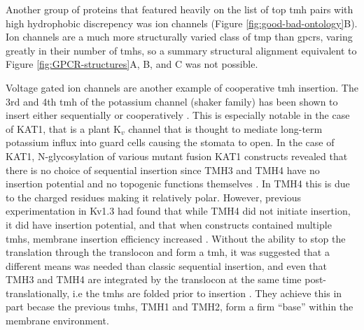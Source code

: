 Another group of proteins that featured heavily on the list of top \gls{tmh} pairs with high hydrophobic discrepency was ion channels (Figure \ref{fig:good-bad-ontology}B).
Ion channels are a much more structurally varied class of \gls{tmp} than \gls{gpcr}s, varing greatly in their number of \gls{tmh}s, so a summary structural alignment equivalent to Figure \ref{fig:GPCR-structures}A, B, and C was not possible.

Voltage gated ion channels are another example of cooperative \gls{tmh} insertion.
The 3rd and 4th \gls{tmh} of the potassium channel (shaker family) has been shown to insert either sequentially or cooperatively \cite{Zhang2007, Cymer2015}.
This is especially notable in the case of KAT1, that is a plant K$_v$ channel that is thought to mediate long-term potassium influx into guard cells causing the stomata to open.
In the case of KAT1, N-glycosylation of various mutant fusion KAT1 constructs revealed that there is no choice of sequential insertion since TMH3 and TMH4 have no insertion potential and no topogenic functions themselves \cite{Sato2002, Sato2003}.
In TMH4 this is due to the charged residues making it relatively polar.
However, previous experimentation in Kv1.3 had found that while TMH4 did not initiate insertion, it did have insertion potential, and that when constructs contained multiple \gls{tmh}s, membrane insertion efficiency increased \cite{Tu2000}.
Without the ability to stop the translation through the translocon and form a \gls{tmh}, it was suggested that a different means was needed than classic sequential insertion, and even that TMH3 and TMH4 are integrated by the translocon at the same time post-translationally, i.e the \gls{tmh}s are folded prior to insertion \cite{Sato2003}.
They achieve this in part becase the previous \gls{tmh}s,  TMH1 and TMH2, form a firm ``base'' within the membrane environment.

